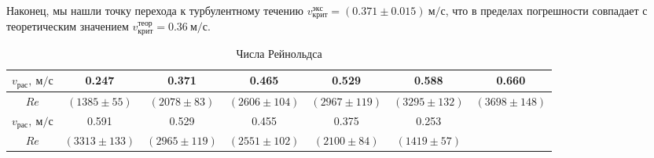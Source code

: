 \documentclass[a4paper, 12pt]{article}
\begin{document}
\paragraph{}
Наконец, мы нашли точку перехода к турбулентному течению $v_{крит}^{экс} = (0.371 \pm 0.015) \: м/с$, что в пределах погрешности совпадает с теоретическим значением $v_{крит}^{теор} = 0.36 \: м/с$.

\begin{table}[h!]
       
        \begin{center}
         \begin{tabular}{|c|c|c|c|c|c|c|}
            \hline
$v_{рас}, \: м/с$ & 0.247 & 0.371 & 0.465 & 0.529 & 0.588 & 0.660\\
\hline
 $Re$ & $(1385 \pm 55)$ & $(2078 \pm 83)$ & $(2606 \pm 104)$ & $(2967 \pm 119)$ & $(3295 \pm 132)$ & $(3698 \pm 148)$ \\
 \hline
$v_{рас}, \: м/с$ & 0.591 & 0.529 & 0.455 & 0.375 & 0.253 & \\
 \hline 
 $Re$ & $(3313 \pm 133)$ & $(2965 \pm 119)$ & $(2551 \pm 102)$ & $(2100 \pm 84)$ & $(1419 \pm 57)$ & \\
 \hline
 \end{tabular}
         \end{center}
         \caption{Числа Рейнольдса}
\end{table}
\end{document}
